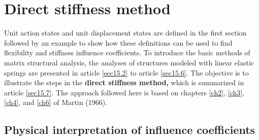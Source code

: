 \documentclass{AeroStructure-ERJohnson}
\begin{document}
\mainmatter

\setcounter{page}{381}

\setcounter{chapter}{14}

\chapter{Direct stiffness method}\label{ch15}

Unit action states and unit displacement states are defined in the first section followed by an example to show how these definitions can be used to find flexibility and stiffness influence coefficients. To introduce the basic methods of matrix structural analysis, the analyses of structures modeled with linear elastic springs are presented in article \ref{sec15.2} to article \ref{sec15.6}. The objective is to illustrate the steps in the \textbf{direct stiffness method, }which is summarized in article \ref{sec15.7}. The approach followed here is based on chapters \ref{ch2}, \ref{ch3}, \ref{ch4}, and \ref{ch6} of Martin (1966).

\section{Physical interpretation of influence coefficients}\label{sec15.1}
\end{document}

